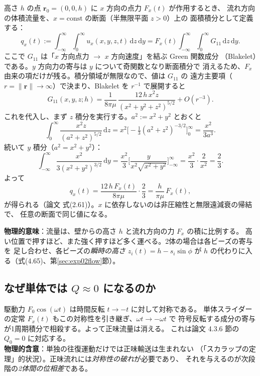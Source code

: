 \documentclass[11pt,a4paper]{article}
\newcommand{\rv}{\bm{r}}
\newcommand{\dd}{\mathrm{d}}
\begin{document}
高さ $h$ の点 $\rv_0=(0,0,h)$ に $x$ 方向の点力 $F_x(t)$ が作用するとき、
流れ方向の体積流量を、$x=\text{const}$ の断面（半無限平面 $z>0$）上の
面積積分として定義する：
\begin{equation}
q_x(t):=\int_{-\infty}^{\infty}\!\!\int_{0}^{\infty}u_x(x,y,z,t)\,\dd z\,\dd y
=F_x(t)\int_{-\infty}^{\infty}\!\!\int_{0}^{\infty}G_{11}\,\dd z\,\dd y.
\end{equation}
ここで $G_{11}$ は「$x$ 方向点力 $\to$ $x$ 方向速度」を結ぶ Green 関数成分
（Blakelet）である。$y$ 方向力の寄与は $y$ について奇関数となり断面積分で
消えるため、$F_x$ 由来の項だけが残る。積分領域が無限なので、値は $G_{11}$ の
遠方主要項（$r=\|\rv\|\to\infty$）で決まり、Blakelet を $r^{-1}$ で展開すると
\begin{equation}
G_{11}(x,y,z;h)=\frac{1}{8\pi\mu}\,\frac{12\,h\,x^2 z}{(x^2+y^2+z^2)^{5/2}}+O(r^{-3}).
\end{equation}
これを代入し、まず $z$ 積分を実行する。$a^2:=x^2+y^2$ とおくと
\begin{equation}
\int_0^{\infty}\frac{x^2 z}{(a^2+z^2)^{5/2}}\,\dd z
=x^2\Big[-\tfrac{1}{3}(a^2+z^2)^{-3/2}\Big]_0^{\infty}
=\frac{x^2}{3a^3}.
\end{equation}
続いて $y$ 積分（$a^2=x^2+y^2$）：
\begin{equation}
\int_{-\infty}^{\infty}\frac{x^2}{3(x^2+y^2)^{3/2}}\,\dd y
=\frac{x^2}{3}\Big[\frac{y}{x^2\sqrt{x^2+y^2}}\Big]_{-\infty}^{\infty}
=\frac{x^2}{3}\cdot\frac{2}{x^2}=\frac{2}{3}.
\end{equation}
よって
\begin{equation}
q_x(t)=\frac{12\,h\,F_x(t)}{8\pi\mu}\cdot\frac{2}{3}
=\frac{h}{\pi\mu}\,F_x(t),
\end{equation}
が得られる（論文 式(2.61)）。$x$ に依存しないのは非圧縮性と無限遠減衰の帰結で、
任意の断面で同じ値になる。

\begin{keybox}
\textbf{物理的意味}：流量は、壁からの高さ $h$ と流れ方向の力 $F_x$ の積に比例する。
高い位置で押すほど、また強く押すほど多く運べる。2体の場合は各ビーズの寄与を
足し合わせ、各ビーズの\emph{瞬時の高さ} $z_i(t)=h-s_i\sin\phi$ が
$h$ の代わりに入る（式(4.65)、第\ref{sec:exp02flow}節）。
\end{keybox}


\subsection{なぜ単体では $Q\approx 0$ になるのか}

\begin{keybox}
駆動力 $F_0\cos(\omega t)$ は時間反転 $t\to-t$ に対して対称である。
単体スライダーの定常 $F_x(t)$ もこの対称性を引き継ぎ、$\omega t\to-\omega t$ で
符号反転する成分の寄与が1周期積分で相殺する。よって正味流量は消える。
これは論文 4.3.6 節の $Q_0=0$ に対応する。\\[4pt]
\textbf{物理的含意}：単独の往復運動だけでは正味輸送は生まれない
（「スカラップの定理」的状況）。正味流れには\emph{対称性の破れ}が必要であり、
それを与えるのが次段階の\emph{2体間の位相差}である。
\end{keybox}
\end{document}
